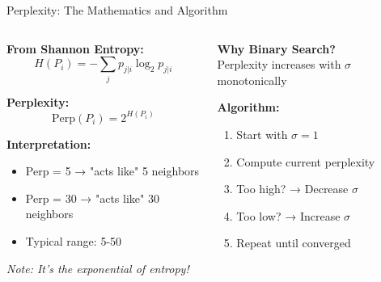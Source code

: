 \documentclass[aspectratio=169]{beamer}
\begin{document}
\begin{frame}{Perplexity: The Mathematics and Algorithm}
\begin{columns}
\begin{tcolorbox}[colback=blue!5, colframe=blue!40, title={\textbf{Mathematical Definition}}]
\textbf{From Shannon Entropy:}
$$H(P_i) = -\sum_j p_{j|i} \log_2 p_{j|i}$$

\vspace{2mm}
\textbf{Perplexity:}
$$\text{Perp}(P_i) = 2^{H(P_i)}$$

\vspace{1mm}
\textbf{Interpretation:}
\begin{itemize}
\item Perp = 5 → "acts like" 5 neighbors
\item Perp = 30 → "acts like" 30 neighbors
\item Typical range: 5-50
\end{itemize}

\small\textit{Note: It's the exponential of entropy!}
\end{tcolorbox}

\begin{tcolorbox}[colback=orange!5, colframe=orange!40, title={\textbf{Finding $\sigma_i$: Binary Search}}]
\small
\textbf{Why Binary Search?}\\
Perplexity increases with $\sigma$ monotonically

\vspace{2mm}
\begin{center}
\end{center}

\textbf{Algorithm:}
\begin{enumerate}
\item Start with $\sigma = 1$
\item Compute current perplexity
\item Too high? → Decrease $\sigma$
\item Too low? → Increase $\sigma$
\item Repeat until converged
\end{enumerate}
\normalsize
\end{tcolorbox}
\end{columns}
\end{frame}
\end{document}
